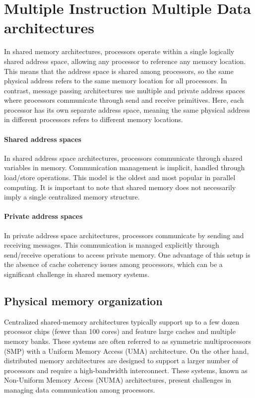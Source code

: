 \section{Multiple Instruction Multiple Data architectures}

In shared memory architectures, processors operate within a single logically shared address space, allowing any processor to reference any memory location. 
This means that the address space is shared among processors, so the same physical address refers to the same memory location for all processors. 
In contrast, message passing architectures use multiple and private address spaces where processors communicate through send and receive primitives. 
Here, each processor has its own separate address space, meaning the same physical address in different processors refers to different memory locations.

\paragraph*{Shared address spaces}
In shared address space architectures, processors communicate through shared variables in memory. 
Communication management is implicit, handled through load/store operations. 
This model is the oldest and most popular in parallel computing. 
It is important to note that shared memory does not necessarily imply a single centralized memory structure.

\paragraph*{Private address spaces}
In private address space architectures, processors communicate by sending and receiving messages. 
This communication is managed explicitly through send/receive operations to access private memory. 
One advantage of this setup is the absence of cache coherency issues among processors, which can be a significant challenge in shared memory systems.

\subsection{Physical memory organization}
Centralized shared-memory architectures typically support up to a few dozen processor chips (fewer than 100 cores) and feature large caches and multiple memory banks. 
These systems are often referred to as symmetric multiprocessors (SMP) with a Uniform Memory Access (UMA) architecture. 
On the other hand, distributed memory architectures are designed to support a larger number of processors and require a high-bandwidth interconnect. 
These systems, known as Non-Uniform Memory Access (NUMA) architectures, present challenges in managing data communication among processors.

